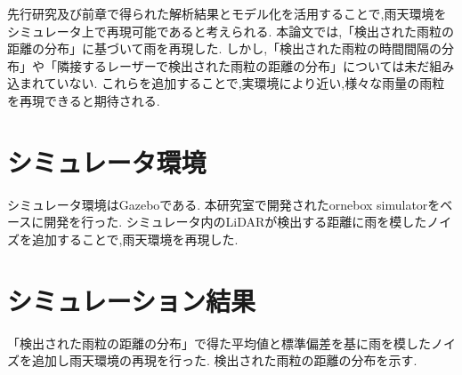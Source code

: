 先行研究\cite{mura}及び前章で得られた解析結果とモデル化を活用することで,雨天環境をシミュレータ上で再現可能であると考えられる.
本論文では,「検出された雨粒の距離の分布」に基づいて雨を再現した.
しかし,「検出された雨粒の時間間隔の分布」や「隣接するレーザーで検出された雨粒の距離の分布」については未だ組み込まれていない.
これらを追加することで,実環境により近い,様々な雨量の雨粒を再現できると期待される.

\section{シミュレータ環境}
シミュレータ環境はGazebo\cite{gaze}である.
本研究室で開発されたornebox simulator\cite{simu}をベースに開発を行った.
シミュレータ内のLiDARが検出する距離に雨を模したノイズを追加することで,雨天環境を再現した.

\section{シミュレーション結果}
「検出された雨粒の距離の分布」で得た平均値と標準偏差を基に雨を模したノイズを追加し雨天環境の再現を行った.
検出された雨粒の距離の分布を示す.
